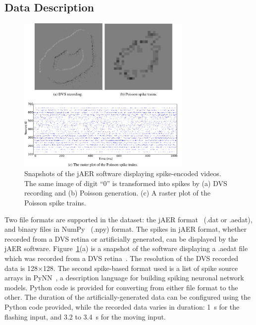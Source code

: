 \documentclass{frontiersENG} %
\begin{document}
\subsection{Data Description}
\begin{figure}[bt!]
	\centering
	\includegraphics[width=0.75\textwidth]{fig1}
	\caption{
		Snapshots of the jAER software displaying spike-encoded videos.
		The same image of digit ``0'' is transformed into spikes by (a) DVS recording and (b) Poisson generation.
		(c) A raster plot of the Poisson spike trains.}
	\label{fig:zero}
\end{figure}
Two file formats are supported in the dataset: the jAER format~\citep{delbruck2008frame} (.dat or .aedat), and binary files in NumPy~\citep{numpyPython} (.npy) format.
The spikes in jAER format, whether recorded from a DVS retina or artificially generated, can be displayed by the jAER software.
Figure~\ref{fig:zero}(a) is a snapshot of the software displaying a .aedat file which was recorded from a DVS retina~\citep{serrano2013128}.
The resolution of the DVS recorded data is 128$\times$128.
The second spike-based format used is a list of spike source arrays in PyNN~\citep{davison2008pynn}, a description language for building spiking neuronal network models.
Python code is provided for converting from either file format to the other.
The duration of the artificially-generated data can be configured using the Python code provided, while the recorded data varies in duration: 1~s for the flashing input, and 3.2 to 3.4~s for the moving input.
\end{document}
